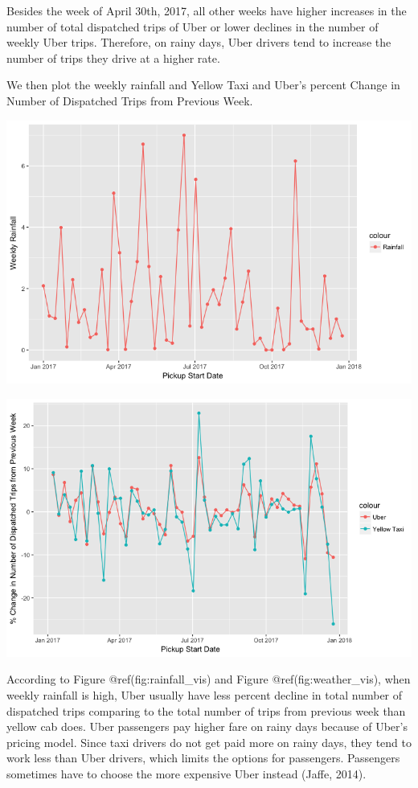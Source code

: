 \documentclass[12pt,twoside]{reedthesis}
\theoremstyle{definition}
\theoremstyle{definition}
\theoremstyle{definition}
\theoremstyle{remark}
\begin{document}
Besides the week of April 30th, 2017, all other weeks have higher
increases in the number of total dispatched trips of Uber or lower
declines in the number of weekly Uber trips. Therefore, on rainy days,
Uber drivers tend to increase the number of trips they drive at a higher
rate.

We then plot the weekly rainfall and Yellow Taxi and Uber's percent
Change in Number of Dispatched Trips from Previous Week.
\begin{center}\includegraphics[width=6.37in]{figure/rainfall_vis} \end{center}
\begin{center}\includegraphics[width=6.51in]{figure/weather_vis} \end{center}

According to Figure @ref(fig:rainfall\_vis) and Figure
@ref(fig:weather\_vis), when weekly rainfall is high, Uber usually have
less percent decline in total number of dispatched trips comparing to
the total number of trips from previous week than yellow cab does. Uber
passengers pay higher fare on rainy days because of Uber's pricing
model. Since taxi drivers do not get paid more on rainy days, they tend
to work less than Uber drivers, which limits the options for passengers.
Passengers sometimes have to choose the more expensive Uber instead
(Jaffe, 2014).
\end{document}
